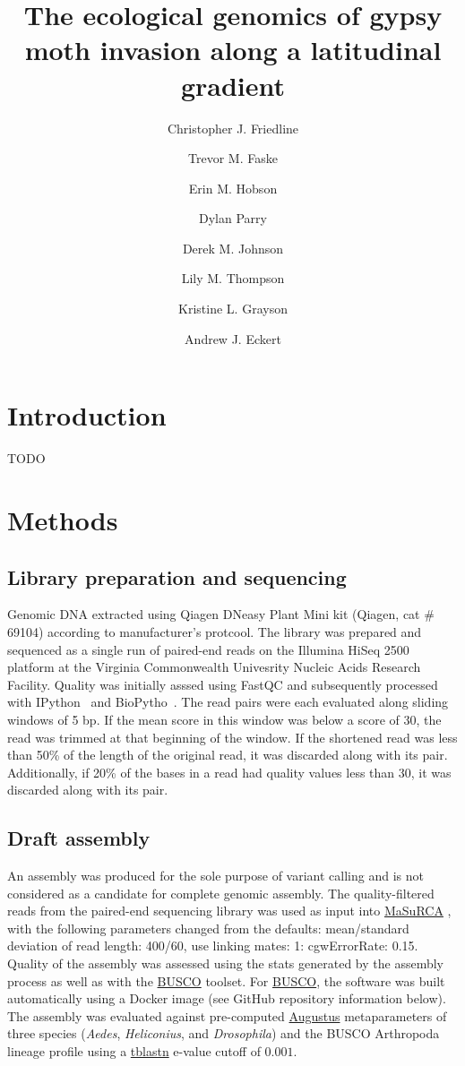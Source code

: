 \documentclass[fleqn,11pt]{wlpeerj}
\title{The ecological genomics of gypsy moth invasion along a latitudinal
gradient}
\author[1]{Christopher J. Friedline}
\author[1]{Trevor M. Faske}
\author[1]{Erin M. Hobson}
\author[2]{Dylan Parry}
\author[1]{Derek M. Johnson}
\author[3]{Lily M. Thompson}
\author[3,*]{Kristine L. Grayson}
\author[1,*,\textdagger]{Andrew J. Eckert}
\affil[1]{Department of Biology, Virginia Commonwealth University}
\affil[2]{College of Environmental Science and Forestry, State University of
New York}
\affil[3]{Department of Biology, University of Richmond}
\affil[*]{Author contributed equally}
\affil[ \textdagger]{Corresponding author}
\begin{document}
\flushbottom
\maketitle
\thispagestyle{empty}

\linenumbers%

\section*{Introduction}
TODO


\section*{Methods}

\subsection*{Library preparation and sequencing}

Genomic DNA extracted using Qiagen DNeasy Plant Mini kit (Qiagen, cat \# 69104)
according to manufacturer's protcool.  The library was prepared and sequenced as
a single run of paired-end reads on the Illumina HiSeq 2500 platform at the
Virginia Commonwealth Univesrity Nucleic Acids Research Facility. Quality was
initially asssed using FastQC \citep{fastqc} and subsequently processed with
IPython~\citep{Perez:2007hy} and BioPytho~\citep{Cock:2009hj}. The read pairs
were each evaluated along sliding windows of 5 bp.  If the mean score in this
window was below a score of 30, the read was trimmed at that beginning of the
window. If the shortened read was less than 50\% of the length of the original
read, it was discarded along with its pair. Additionally, if 20\% of the bases
in a read had quality values less than 30, it was discarded along with its pair.

\subsection*{Draft assembly}

An assembly was produced for the sole purpose of variant calling and is not
considered as a candidate for complete genomic assembly. The quality-filtered
reads from the paired-end sequencing library was used as input into
\url{MaSuRCA} \citep[][version 2.3.2]{Zimin:2013kn}, with the following
parameters changed from the defaults: mean/standard deviation of read length:
400/60, use linking mates: 1: cgwErrorRate: 0.15.  Quality of the assembly was
assessed using the stats generated by the assembly process as well as with the
\url{BUSCO} \citep[][version 1.1b1]{Simao:2015kk} toolset. For
\url{BUSCO}, the software was built automatically using a Docker image (see
GitHub repository information below). The assembly was evaluated against
pre-computed \url{Augustus} \citep{Stanke:2003eo} metaparameters of  three
species (\textit{Aedes}, \textit{Heliconius}, and \textit{Drosophila}) and the
BUSCO Arthropoda lineage profile using a \url{tblastn} e-value cutoff of
$0.001$.
\end{document}
